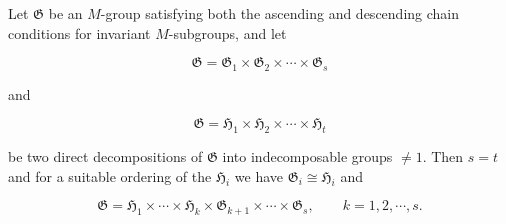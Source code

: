 Let $\mathfrak{G}$ be an $M$-group satisfying both the ascending and descending chain conditions for invariant $M$-subgroups, and let

$$\mathfrak{G} = \mathfrak{G}_1 \times \mathfrak{G}_2 \times \cdots \times \mathfrak{G}_s$$

and

$$\mathfrak{G} = \mathfrak{H}_1 \times \mathfrak{H}_2 \times \cdots \times \mathfrak{H}_t$$

be two direct decompositions of $\mathfrak{G}$ into indecomposable groups $\neq 1$. Then $s = t$ and for a suitable ordering of the $\mathfrak{H}_i$ we have $\mathfrak{G}_i \cong \mathfrak{H}_i$ and

$$\mathfrak{G} = \mathfrak{H}_1 \times \cdots \times \mathfrak{H}_k \times \mathfrak{G}_{k+1} \times \cdots \times \mathfrak{G}_s, \qquad k = 1, 2, \cdots, s.$$
